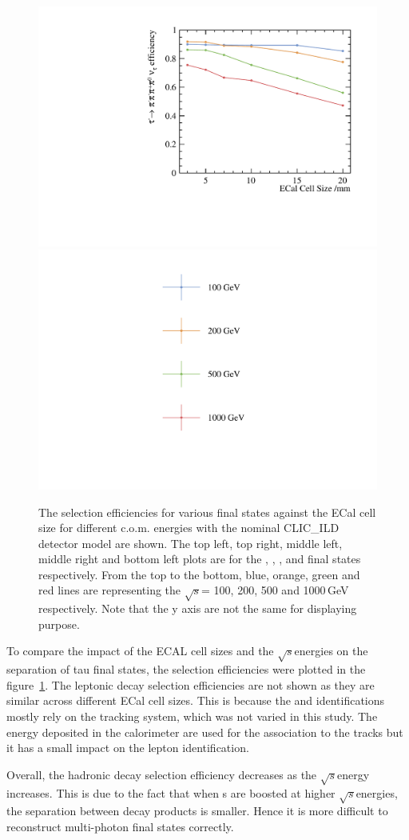 \documentclass[a4paper,11pt]{article}
\newcommand{\decayPion}{\PGpm\PGnGt}
\newcommand{\decayRho}{\PGrP{\PGpm\PGpz}\PGnGt}
\newcommand{\decayAiPhoton}{\PaDoP{\PGpm\PGpz\PGpz}\PGnGt}
\newcommand{\decayAiPion}{\PaDoP{\PGpm\PGpm\PGpp}\PGnGt}
\newcommand{\decayThreePionPhoton}{\PGpm\PGpm\PGpp\PGnGt}
\newcommand{\rootS}{\ensuremath{\sqrt{s}}}
\begin{document}
\begin{figure}[htbp]
\qquad
\includegraphics[width=.45\textwidth]{plots/decayMode6}
\qquad
\includegraphics[width=.45\textwidth]{plots/legend}
\caption{\label{fig:pion_efficiency} The selection efficiencies for various final states against the ECal cell size for different c.o.m. energies with the nominal CLIC\_ILD detector model are shown. The top left, top right, middle left, middle right and bottom left plots are for the \decayPion, \decayRho,  \decayAiPhoton, \decayAiPion  and \decayThreePionPhoton  final states respectively. From the top to the bottom, blue, orange, green and red lines are representing the \rootS = 100, 200, 500 and 1000\,GeV respectively. Note that the y axis are not the same for displaying purpose.}
\end{figure}

To compare the impact of the ECAL cell sizes and the \rootS energies on the separation of tau final states, the selection efficiencies were plotted in the figure~\ref{fig:pion_efficiency}. The leptonic decay selection efficiencies are not shown as they are similar across different ECal cell sizes. This is because the \Pepm and \PGmpm identifications mostly rely on the tracking system, which was not varied in this study. The energy deposited in the calorimeter are used for the association to the tracks but it has a small impact on the lepton identification. 

Overall, the hadronic decay selection efficiency decreases as the \rootS energy increases. This is due to the fact that when {\PGt}s are boosted at higher \rootS energies, the separation between decay products is smaller. Hence it is more difficult to reconstruct multi-photon final states correctly.
\end{document}
